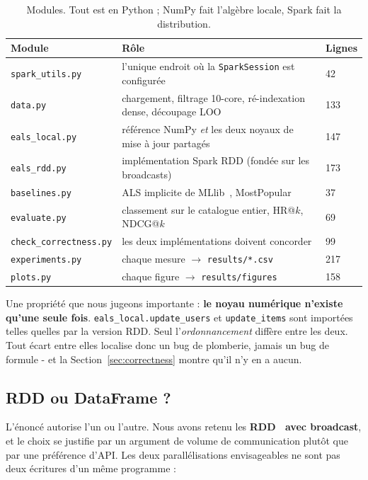 \documentclass[11pt,a4paper]{article}
\begin{document}
\begin{table}[h]
\centering\small
\caption{Modules. Tout est en Python ; NumPy fait l'algèbre locale, Spark fait la
distribution.}\label{tab:modules}
\begin{tabular}{@{}lll@{}}
\toprule
Module & Rôle & Lignes \\
\midrule
\texttt{spark\_utils.py}      & l'unique endroit où la \texttt{SparkSession} est configurée & 42 \\
\texttt{data.py}              & chargement, filtrage 10-core, ré-indexation dense, découpage LOO & 133 \\
\texttt{eals\_local.py}       & référence NumPy \emph{et} les deux noyaux de mise à jour partagés & 147 \\
\texttt{eals\_rdd.py}         & implémentation Spark RDD (fondée sur les broadcasts) & 173 \\
\texttt{baselines.py}         & ALS implicite de MLlib~\cite{meng2016mllib}, MostPopular & 37 \\
\texttt{evaluate.py}          & classement sur le catalogue entier, HR@$k$, NDCG@$k$ & 69 \\
\texttt{check\_correctness.py}& les deux implémentations doivent concorder & 99 \\
\texttt{experiments.py}       & chaque mesure $\rightarrow$ \texttt{results/*.csv} & 217 \\
\texttt{plots.py}             & chaque figure $\rightarrow$ \texttt{results/figures} & 158 \\
\bottomrule
\end{tabular}
\end{table}

Une propriété que nous jugeons importante : \textbf{le noyau numérique n'existe qu'une
seule fois}. \texttt{eals\_local.update\_users} et \texttt{update\_items} sont
importées telles quelles par la version RDD. Seul l'\emph{ordonnancement} diffère entre
les deux. Tout écart entre elles localise donc un bug de plomberie, jamais un bug de
formule - et la Section~\ref{sec:correctness} montre qu'il n'y en a aucun.

\subsection{RDD ou DataFrame ?}

L'énoncé autorise l'un ou l'autre. Nous avons retenu les
\textbf{RDD~\cite{zaharia2012rdd} avec broadcast}, et le choix se justifie par un
argument de volume de communication plutôt que par une préférence d'API. Les deux
parallélisations envisageables ne sont pas deux écritures d'un même programme :
\end{document}
